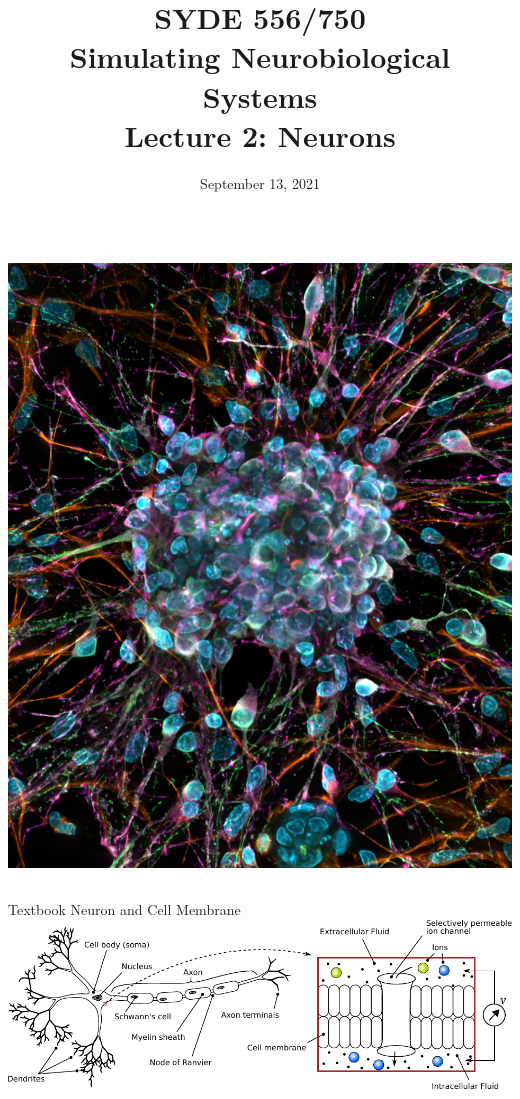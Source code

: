\documentclass[handout,aspectratio=169]{beamer}
\date{September 13, 2021}
\title{SYDE 556/750 \\ Simulating Neurobiological Systems \\ Lecture 2: Neurons}
\begin{document}
	
\begin{frame}{}
	\vspace{0.5cm}
	\begin{columns}[c]
		\MakeTitle
		\includegraphics[width=\textwidth]{media/Rat_primary_cortical_neuron_culture_deconvolved_z-stack_overlay_(30614937102)_small.jpg}
	\end{columns}
\end{frame}

\begin{frame}{Textbook Neuron and Cell Membrane}
	\includegraphics[width=\textwidth]{media/neuron_sketch_membrane.pdf}
\end{frame}
\end{document}
